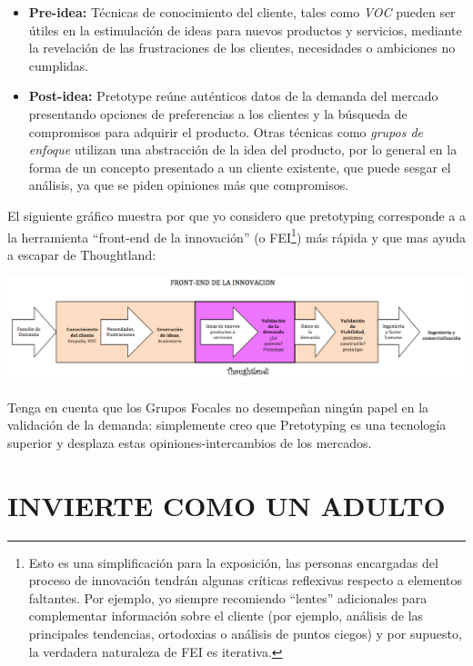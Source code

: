 \documentclass{article}
\begin{document}
\begin{itemize}

\item \textbf{Pre-idea:} T\'ecnicas de conocimiento del cliente, tales como \textit{VOC} pueden ser \'utiles en la estimulaci\'on de ideas para nuevos productos y servicios, mediante la revelaci\'on de las frustraciones de los clientes, necesidades o ambiciones no cumplidas.

\item \textbf{Post-idea:} Pretotype re\'une aut\'enticos datos de la demanda del mercado presentando opciones de preferencias a los clientes y la b\'usqueda de compromisos para adquirir el producto. Otras t\'ecnicas como \textit{grupos de enfoque} utilizan una abstracci\'on de la idea del producto, por lo general en la forma de un concepto presentado a un cliente existente, que puede sesgar el an\'alisis, ya que se piden opiniones m\'as que compromisos.

\end{itemize}

El siguiente gr\'afico muestra por que yo considero que pretotyping corresponde a a la herramienta ``front-end de la innovaci\'on'' (o FEI\footnote{Esto es una simplificaci\'on para la exposici\'on, las personas encargadas del proceso de innovaci\'on tendr\'an algunas cr\'iticas reflexivas respecto a elementos faltantes. Por ejemplo, yo siempre recomiendo ``lentes'' adicionales para complementar informaci\'on sobre el cliente (por ejemplo, an\'alisis de las principales tendencias, ortodoxias o an\'alisis de puntos ciegos) y por supuesto, la verdadera naturaleza de FEI es iterativa.})  m\'as r\'apida y que mas ayuda a escapar de Thoughtland:

\begin{center}
    \includegraphics[width=1.1\textwidth]{frontend}
\end{center}

Tenga en cuenta que los Grupos Focales no desempe\~nan ning\'un papel en la validaci\'on de la demanda: simplemente creo que Pretotyping es una tecnolog\'ia superior y desplaza estas opiniones-intercambios de los mercados.

\clearpage
\section{INVIERTE COMO UN ADULTO}
\end{document}
